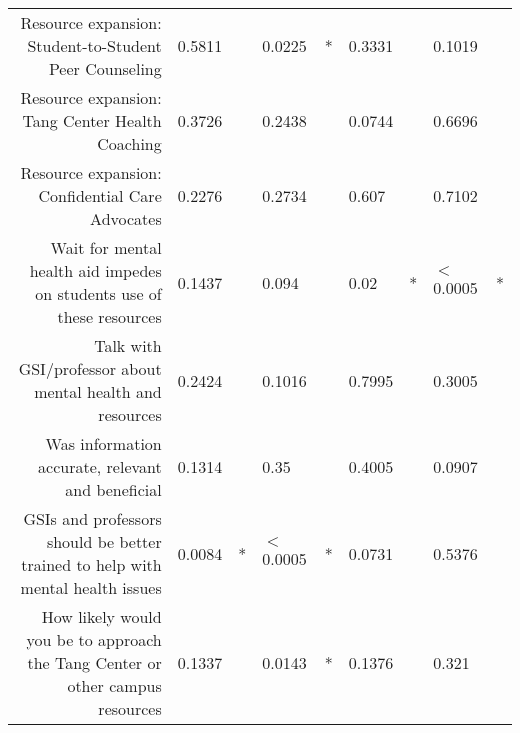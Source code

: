 \documentclass{article}\usepackage[]{graphicx}\usepackage[]{color}
\begin{document}
\begin{table}[ht]
{\begin{tabular}{rllllllll}
  Resource expansion: Student-to-Student Peer Counseling & 0.5811 &   & 0.0225 & * & 0.3331 &   & 0.1019 &   \\ 
  Resource expansion: Tang Center Health Coaching & 0.3726 &   & 0.2438 &   & 0.0744 &   & 0.6696 &   \\ 
  Resource expansion: Confidential Care Advocates & 0.2276 &   & 0.2734 &   & 0.607 &   & 0.7102 &   \\ 
  Wait for mental health aid impedes on students use of these resources & 0.1437 &   & 0.094 &   & 0.02 & * & $<$0.0005 & * \\ 
  Talk with GSI/professor about mental health and resources & 0.2424 &   & 0.1016 &   & 0.7995 &   & 0.3005 &   \\ 
  Was information accurate, relevant and beneficial & 0.1314 &   & 0.35 &   & 0.4005 &   & 0.0907 &   \\ 
  GSIs and professors should be better trained to help with mental health issues & 0.0084 & * & $<$0.0005 & * & 0.0731 &   & 0.5376 &   \\ 
  How likely would you be to approach the Tang Center or other campus resources & 0.1337 &   & 0.0143 & * & 0.1376 &   & 0.321 &   \\ 
   \hline
\end{tabular}
}
\end{table}
\end{document}
